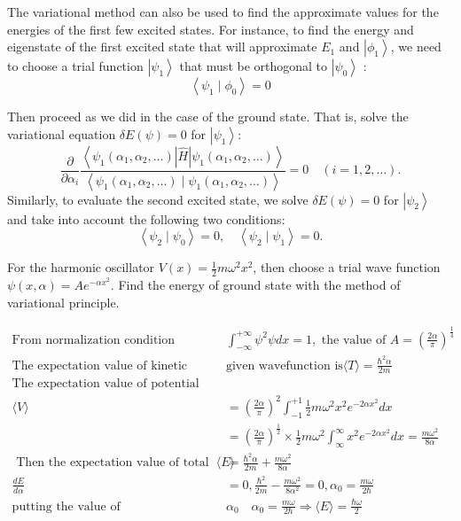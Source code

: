  The variational method can also be used to find the approximate values for the energies of the first few excited states. For instance, to find the energy and eigenstate of the first excited state that will approximate $E_{1}$ and $\left|\phi_{1}\right\rangle$, we need to choose a trial function $\left|\psi_{1}\right\rangle$ that must be orthogonal to $\left|\psi_{0}\right\rangle$ :
$$\left\langle\psi_{1} \mid \phi_{0}\right\rangle=0$$

Then proceed as we did in the case of the ground state. That is, solve the variational equation $\delta E(\psi)=0$ for $\left|\psi_{1}\right\rangle:$
$$
\frac{\partial}{\partial \alpha_{i}} \frac{\left\langle\psi_{1}\left(\alpha_{1}, \alpha_{2}, \ldots\right)|\hat{H}| \psi_{1}\left(\alpha_{1}, \alpha_{2}, \ldots\right)\right\rangle}{\left\langle\psi_{1}\left(\alpha_{1}, \alpha_{2}, \ldots\right) \mid \psi_{1}\left(\alpha_{1}, \alpha_{2}, \ldots\right)\right\rangle}=0 \quad(i=1,2, \ldots) .
$$
Similarly, to evaluate the second excited state, we solve $\delta E(\psi)=0$ for  $\left|\psi_{2}\right\rangle$ and take into account the following two conditions:
$$
\left\langle\psi_{2} \mid \psi_{0}\right\rangle=0, \quad\left\langle\psi_{2} \mid \psi_{1}\right\rangle=0 .
$$
\begin{exercise}
 For the harmonic oscillator $V(x)=\frac{1}{2} m \omega^{2} x^{2}$, then choose a trial wave function $\psi(x, \alpha)=A e^{-\alpha x^{2}}$. Find the energy of ground state with the method of variational principle.
\end{exercise}
\begin{answer}
	\begin{align*}
		\text{From normalization condition }&\int_{-\infty}^{+\infty} \psi^{2} \psi d x=1,\text{ the value of }A=\left(\frac{2 \alpha}{\pi}\right)^{\frac{1}{4}}\\
	\text{The expectation value of kinetic energy for  }&\text{given wavefunction is}\langle T\rangle=\frac{\hbar^{2} \alpha}{2 m}\\
	\text{The expectation value of potential energy}\\
	\langle V\rangle&=\left(\frac{2 \alpha}{\pi}\right)^{2} \int_{-1}^{+1} \frac{1}{2} m \omega^{2} x^{2} e^{-2 \alpha x^{2}} d x\\
	&=\left(\frac{2 \alpha}{\pi}\right)^{\frac{1}{2}} \times \frac{1}{2} m \omega^{2} \int_{\infty}^{\infty} x^{2} e^{-2 \alpha x^{2}} d x
	=\frac{m \omega^{2}}{8 \alpha}\\
\text{	Then the expectation value of total energy is }\langle E\rangle&=\frac{\hbar^{2} \alpha}{2 m}+\frac{m \omega^{2}}{8 \alpha}\\
	\frac{d E}{d \alpha}&=0, \frac{\hbar^{2}}{2 m}-\frac{m \omega^{2}}{8 \alpha^{2}}=0, \alpha_{0}=\frac{m \omega}{2 \hbar}\\
	\text{putting the value of }&\alpha_{0} \quad \alpha_{0}=\frac{m \omega}{2 \hbar} \Rightarrow\langle E\rangle=\frac{\hbar \omega}{2}
	\end{align*}
\end{answer}
